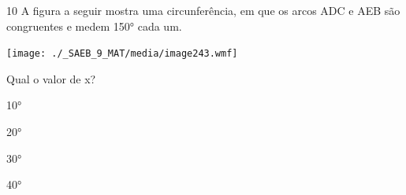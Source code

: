 \begin{escolha}
\begin{boxmedio}
\begin{boxmedio}
{\begin{boxpeq}
\begin{boxpeq}
{\begin{boxpeq}
\begin{boxmedio}
\begin{boxmedio}
\begin{boxpeq}
\begin{boxmedio}
\begin{boxpeq}
\begin{boxpeq}
\begin{boxpeq}
\begin{boxpeq}
\begin{boxmedio}
{\begin{boxmedio}
\begin{boxmedio}
\begin{boxpeq}
\begin{boxmedio}
\begin{boxpeq}
\begin{boxpeq}
\begin{boxpeq}
\begin{escolha}
{\begin{boxmedio}
\begin{boxpeq}
\begin{boxpeq}
\begin{boxpeq}
\begin{boxpeq}
\begin{boxpeq}
\begin{boxmedio}
\begin{boxpeq}
\begin{boxpeq}
\begin{boxpeq}
{\begin{boxpeq}
\begin{boxmedio}
\begin{boxpeq}
\begin{boxpeq}
\begin{boxpeq}
{\begin{boxpeq}
\begin{boxmedio}
{\begin{boxpeq}
\begin{boxpeq}
\begin{boxmedio}
\begin{boxmedio}
\begin{boxpeq}
\begin{boxpeq}
{\begin{boxpeq}
\begin{boxpeq}
\begin{boxpeq}
\begin{boxpeq}
\begin{boxpeq}
\begin{escolha}
\begin{escolha}
{\begin{boxmedio}
\begin{boxpeq}
\begin{q°}
\begin{boxmedio}
\begin{boxpeq}
\begin{boxpeq}
\begin{boxmedio}
\begin{boxmedio}
\begin{boxmedio}
\begin{boxmedio}
{\begin{enumerate}
\begin{boxpeq}
{\begin{boxpeq}
\begin{boxpeq}
\begin{boxmedio}
\begin{boxpeq}
\begin{boxpeq}
\begin{boxpeq}
\begin{escolha}
\begin{escolha}
\num{10} A figura a seguir mostra uma circunferência, em que os arcos ADC e
AEB são congruentes e medem 150° cada um.

\texttt{[image: ./\_SAEB\_9\_MAT/media/image243.wmf]}


Qual o valor de x?

\begin{escolha}
  
  \item 10°

  \item 20°

  \item 30° 
  
  \item 40° 

\end{escolha}

\end{escolha}
\end{escolha}
\end{boxpeq}
\end{boxpeq}
\end{boxpeq}
\end{boxmedio}
\end{boxpeq}
\end{boxpeq}}
\end{boxpeq}
\end{enumerate}}
\end{boxmedio}
\end{boxmedio}
\end{boxmedio}
\end{boxmedio}
\end{boxpeq}
\end{boxpeq}
\end{boxmedio}
\end{q°}
\end{boxpeq}
\end{boxmedio}}
\end{escolha}
\end{escolha}
\end{boxpeq}
\end{boxpeq}
\end{boxpeq}
\end{boxpeq}
\end{boxpeq}}
\end{boxpeq}
\end{boxpeq}
\end{boxmedio}
\end{boxmedio}
\end{boxpeq}
\end{boxpeq}}
\end{boxmedio}
\end{boxpeq}}
\end{boxpeq}
\end{boxpeq}
\end{boxpeq}
\end{boxmedio}
\end{boxpeq}}
\end{boxpeq}
\end{boxpeq}
\end{boxpeq}
\end{boxmedio}
\end{boxpeq}
\end{boxpeq}
\end{boxpeq}
\end{boxpeq}
\end{boxpeq}
\end{boxmedio}}
\end{escolha}
\end{boxpeq}
\end{boxpeq}
\end{boxpeq}
\end{boxmedio}
\end{boxpeq}
\end{boxmedio}
\end{boxmedio}}
\end{boxmedio}
\end{boxpeq}
\end{boxpeq}
\end{boxpeq}
\end{boxpeq}
\end{boxmedio}
\end{boxpeq}
\end{boxmedio}
\end{boxmedio}
\end{boxpeq}}
\end{boxpeq}
\end{boxpeq}}
\end{boxmedio}
\end{boxmedio}
\end{escolha}
